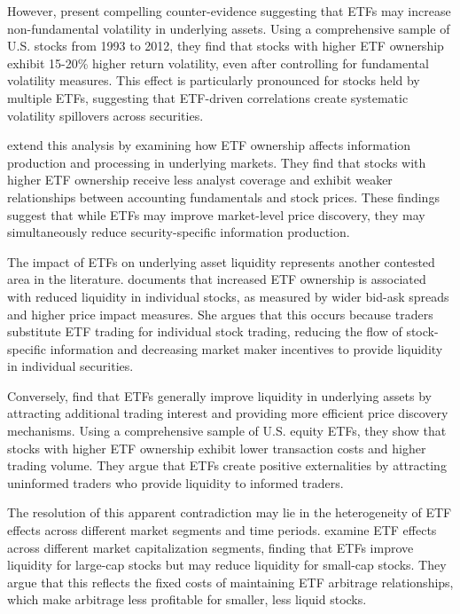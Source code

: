 However, \citet{ben2018etfs} present compelling counter-evidence suggesting that ETFs may increase non-fundamental volatility in underlying assets. Using a comprehensive sample of U.S. stocks from 1993 to 2012, they find that stocks with higher ETF ownership exhibit 15-20\% higher return volatility, even after controlling for fundamental volatility measures. This effect is particularly pronounced for stocks held by multiple ETFs, suggesting that ETF-driven correlations create systematic volatility spillovers across securities.

\citet{israeli2017etf} extend this analysis by examining how ETF ownership affects information production and processing in underlying markets. They find that stocks with higher ETF ownership receive less analyst coverage and exhibit weaker relationships between accounting fundamentals and stock prices. These findings suggest that while ETFs may improve market-level price discovery, they may simultaneously reduce security-specific information production.

The impact of ETFs on underlying asset liquidity represents another contested area in the literature. \citet{hamm2014liquidity} documents that increased ETF ownership is associated with reduced liquidity in individual stocks, as measured by wider bid-ask spreads and higher price impact measures. She argues that this occurs because traders substitute ETF trading for individual stock trading, reducing the flow of stock-specific information and decreasing market maker incentives to provide liquidity in individual securities.

Conversely, \citet{agarwal2018etfs} find that ETFs generally improve liquidity in underlying assets by attracting additional trading interest and providing more efficient price discovery mechanisms. Using a comprehensive sample of U.S. equity ETFs, they show that stocks with higher ETF ownership exhibit lower transaction costs and higher trading volume. They argue that ETFs create positive externalities by attracting uninformed traders who provide liquidity to informed traders.

The resolution of this apparent contradiction may lie in the heterogeneity of ETF effects across different market segments and time periods. \citet{krause2014exchange} examine ETF effects across different market capitalization segments, finding that ETFs improve liquidity for large-cap stocks but may reduce liquidity for small-cap stocks. They argue that this reflects the fixed costs of maintaining ETF arbitrage relationships, which make arbitrage less profitable for smaller, less liquid stocks.

